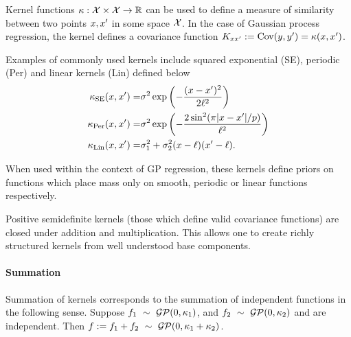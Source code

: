 \documentclass[twoside]{article}
\begin{document}
Kernel functions $\kappa : \mathcal{X} \times \mathcal{X} \to \mathbb{R}$ can be used to define a measure of similarity between two points $x, x'$ in some space $\mathcal{X}$.
In the case of Gaussian process regression, the kernel defines a covariance function ${K_{x x'} := \textrm{Cov}(y, y') = \kappa(x,x')}$.

Examples of commonly used kernels include squared exponential (SE), periodic (Per) and linear kernels (Lin) defined below
\begin{eqnarray}
\kappa_\textrm{SE}(x, x') = & \sigma^2\exp\left(-\frac{(x - x')^2}{2\ell^2}\right) \\
\kappa_\textrm{Per}(x, x') = & \sigma^2\exp\left(-\frac{2\sin^2(\pi|x - x'|/p)}{\ell^2}\right) \\
\kappa_\textrm{Lin}(x, x') = & \sigma_1^2 + \sigma_2^2(x - \ell)(x' - \ell).
\end{eqnarray}

When used within the context of GP regression, these kernels define priors on functions which place mass only on smooth, periodic or linear functions respectively.

Positive semidefinite kernels (\ie those which define valid covariance functions) are closed under addition and multiplication.
This allows one to create richly structured kernels from well understood base components.

%


\paragraph{Summation}

Summation of kernels corresponds to the summation of independent functions in the following sense.
Suppose ${f_1 \ \sim\  \mathcal{GP}(0, \kappa_1)}$, and ${f_2 \ \sim\  \mathcal{GP}(0, \kappa_2)}$ and are independent.
Then ${f := f_1 + f_2 \ \sim\  \mathcal{GP}(0, \kappa_1 + \kappa_2)}$\footnotemark.
\end{document}
